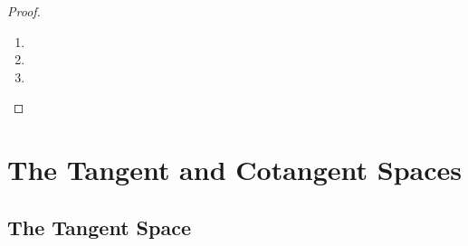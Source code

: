 \documentclass{book}
\begin{document}
\begin{proof}\ 
	\begin{enumerate}
		\item 
		\item 
		\item 
	\end{enumerate}
\end{proof}






































































	\newpage
	\chapter{The Tangent and Cotangent Spaces}
	\section{The Tangent Space}

\end{document}
